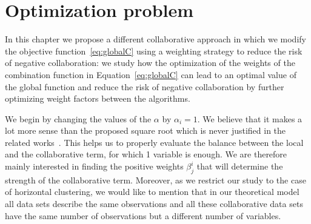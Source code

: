 



\label{sec:opt-w}

\section{Optimization problem}

In this chapter we  propose a different collaborative approach in which we modify the objective function~\eqref{eq:globalC} using a weighting  strategy to reduce the risk of negative collaboration: we study how the optimization of the weights of the combination function in Equation~\eqref{eq:globalC} can lead to an optimal value of the global function and reduce the risk of negative collaboration by further optimizing weight factors between the algorithms.

We begin by changing the values of the $\alpha$ by $\alpha_i=1$. We believe that it makes a lot more sense than the proposed square root which is never justified in the related works~\cite{grozavu2010topological,grozavu2011learning}. This helps us to properly evaluate the balance between the local and the collaborative term, for which 1 variable is enough.
We are therefore mainly interested in finding the positive weights $\beta_j^i$ that will determine the strength of the collaborative term. 
Moreover, as we restrict our study to the case of horizontal clustering, we would like to mention that in our theoretical model all data sets describe the same observations and all these collaborative data sets have the same number of observations but a different number of variables.  


